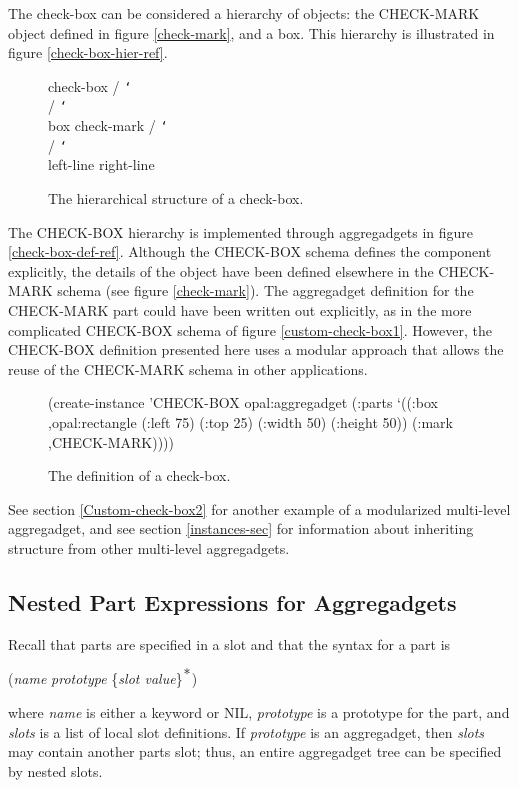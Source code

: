 The check-box can be considered a hierarchy of objects:  the CHECK-MARK
object defined in figure \ref{check-mark}, and a box.  This
hierarchy is illustrated in figure \ref{check-box-hier-ref}.

\begin{figure}
\begin{programexample}

                             check-box
                               /  {\tt\char`\\}
                              /    {\tt\char`\\}
                            box  check-mark
                                    /  {\tt\char`\\}
                                   /    {\tt\char`\\}
                            left-line   right-line
\end{programexample}
\caption{The hierarchical structure of a check-box.}
\end{figure}

The CHECK-BOX hierarchy is implemented through aggregadgets in figure
\ref{check-box-def-ref}.  Although the CHECK-BOX schema defines the
 component explicitly, the details of the  object have
been defined elsewhere in the CHECK-MARK schema (see
figure \ref{check-mark}).
The aggregadget definition for the CHECK-MARK part could have been
written out explicitly, as in the more complicated CHECK-BOX schema of
figure \ref{custom-check-box1}.  However, the CHECK-BOX definition
presented here uses a modular approach that allows the reuse of the
CHECK-MARK schema in other applications.

\begin{figure}
\begin{programexample}
(create-instance 'CHECK-BOX opal:aggregadget
   (:parts
    `((:box ,opal:rectangle
            (:left 75)
            (:top 25)
            (:width 50)
            (:height 50))
      (:mark ,CHECK-MARK))))
\end{programexample}
\caption{The definition of a check-box.}
\end{figure}

See section \ref{Custom-check-box2} for another example of a modularized
multi-level aggregadget, and see section \ref{instances-sec} for
information about inheriting structure from other multi-level aggregadgets.

\subsection{Nested Part Expressions for Aggregadgets}
Recall that parts are specified in a  slot and
that the syntax for a part is
\begin{display}
({\it name} {\it prototype} \{{\it slot  value}\}$^{\hbox{*}}$)
\end{display}
where {\it name} is either a keyword or NIL, {\it prototype} is a prototype
for the part, and {\it slots} is a list of local slot definitions.
If {\it prototype} is an aggregadget, then {\it slots} may contain
another parts slot; thus, an entire aggregadget tree can be specified
by nested  slots.

